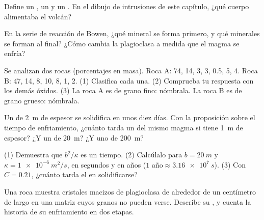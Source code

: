 \begin{exercise}[$\star$]\label{exo:g11:igneous-rocks:4}
Define un , un  y un . En el dibujo de intrusiones de este
capítulo, ¿qué cuerpo alimentaba el volcán?
\end{exercise}

\begin{exercise}[$\star$]\label{exo:g11:igneous-rocks:5}
En la serie de reacción de Bowen, ¿qué mineral se forma primero, y qué
minerales se forman al final? ¿Cómo cambia la plagioclasa a medida que el
magma se enfría?
\end{exercise}

\begin{exercise}[$\star\star$]\label{exo:g11:igneous-rocks:6}
Se analizan dos rocas (porcentajes en masa). Roca A:  74, 
14,  3,  3,  0.5,  5,  4. Roca B:
 47,  14,  8,  10,  8, 
1,  2. (1) Clasifica cada una. (2) Comprueba tu respuesta con los
demás óxidos. (3) La roca A es de grano fino: nómbrala. La roca B es de grano
grueso: nómbrala.
\end{exercise}

\begin{exercise}[$\star\star$]\label{exo:g11:igneous-rocks:7}
Un  de \qty{2}{m} de espesor se solidifica en unos diez días. Con la
proposición sobre el tiempo de enfriamiento, ¿cuánto tarda un  del mismo
magma si tiene \qty{1}{m} de espesor? ¿Y un  de \qty{20}{m}? ¿Y uno
de \qty{200}{m}?
\end{exercise}

\begin{exercise}[$\star\star$]\label{exo:g11:igneous-rocks:8}
(1) Demuestra que $b^2/\kappa$ es un tiempo. (2) Calcúlalo para
$b = \qty{20}{m}$ y $\kappa = \qty{1e-6}{m^2/s}$, en segundos y en años
($\num{1}\text{ año} \approx \qty{3.16e7}{s}$). (3) Con $C = 0.21$, ¿cuánto
tarda el  en solidificarse?
\end{exercise}

\begin{exercise}[$\star\star$]\label{exo:g11:igneous-rocks:9}
Una roca muestra cristales macizos de plagioclasa de alrededor de un
centímetro de largo en una matriz cuyos granos no pueden verse. Describe su
, y cuenta la historia de su enfriamiento en dos etapas.
\end{exercise}

